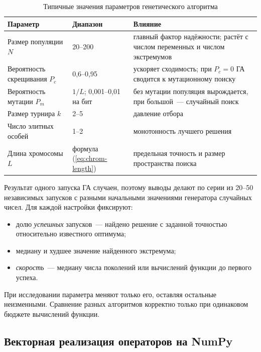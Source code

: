 \begin{table}[!htb]
\caption{Типичные значения параметров генетического алгоритма}
\label{tab:ga-params}
\centering\small
\begin{tabularx}{\textwidth}{>{\raggedright}p{4.6cm}>{\raggedright}p{3.1cm}X}
\toprule
Параметр & Диапазон & Влияние \\
\midrule
Размер популяции $N$ & 20--200 & главный фактор надёжности; растёт с числом переменных и числом экстремумов \\
Вероятность скрещивания $P_c$ & 0,6--0,95 & ускоряет сходимость; при $P_c = 0$ ГА сводится к мутационному поиску \\
Вероятность мутации $P_m$ & $1/L$; 0,001--0,01 на бит & без мутации популяция вырождается, при большой~--- случайный поиск \\
Размер турнира $k$ & 2--5 & давление отбора \\
Число элитных особей & 1--2 & монотонность лучшего решения \\
Длина хромосомы $L$ & формула (\ref{eq:chrom-length}) & предельная точность и размер пространства поиска \\
\bottomrule
\end{tabularx}
\end{table}

Результат одного запуска ГА случаен, поэтому выводы делают по серии из 20--50 независимых запусков с
разными начальными значениями генератора случайных чисел. Для каждой настройки фиксируют:
\begin{itemize}
\item долю \emph{успешных} запусков~--- найдено решение с заданной точностью относительно известного
оптимума;
\item медиану и худшее значение найденного экстремума;
\item \emph{скорость}~--- медиану числа поколений или вычислений функции до первого успеха.
\end{itemize}
При исследовании параметра меняют только его, оставляя остальные неизменными. Сравнение разных
алгоритмов корректно только при одинаковом бюджете вычислений функции.

\subsection{Векторная реализация операторов на NumPy}
\label{sec:ga-numpy}

